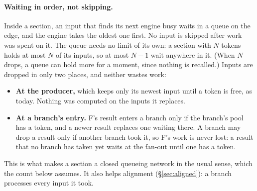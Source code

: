 \documentclass[11pt]{article}
\begin{document}
\paragraph{Waiting in order, not skipping.} Inside a section, an input that
finds its next engine busy waits in a queue on the edge, and the engine takes
the oldest one first. No input is skipped after work was spent on it. The
queue needs no limit of its own: a section with $N$ tokens holds at most $N$
of its inputs, so at most $N - 1$ wait anywhere in it. (When $N$ drops, a
queue can hold more for a moment, since nothing is recalled.) Inputs are
dropped in only two places, and neither wastes work:
\begin{itemize}[nosep]
  \item \textbf{At the producer,} which keeps only its newest input until a
        token is free, as today. Nothing was computed on the inputs it
        replaces.
  \item \textbf{At a branch's entry.} F's result enters a branch only if the
        branch's pool has a token, and a newer result replaces one waiting
        there. A branch may drop a result only if another branch took it, so
        F's work is never lost: a result that no branch has taken yet waits
        at the fan-out until one has a token.
\end{itemize}
This is what makes a section a closed queueing network in the usual sense,
which the count below assumes. It also helps alignment
(\S\ref{sec:aligned}): a branch processes every input it took.
\end{document}
